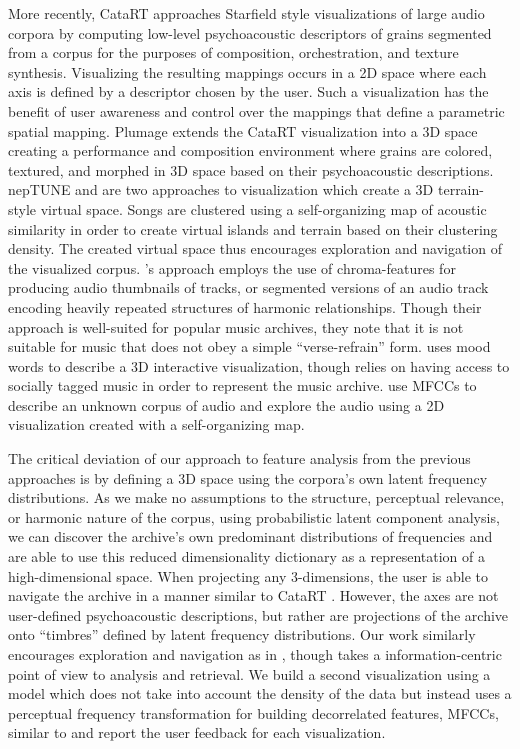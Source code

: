 More recently, CataRT \cite{Schwarz2008} approaches Starfield style visualizations of large audio corpora by computing low-level psychoacoustic descriptors of grains segmented from a corpus for the purposes of composition, orchestration, and texture synthesis.  Visualizing the resulting mappings occurs in a 2D space where each axis is defined by a descriptor chosen by the user.  Such a visualization has the benefit of user awareness and control over the mappings that define a parametric spatial mapping.  Plumage \cite{Schwarz2008} extends the CataRT visualization into a 3D space creating a performance and composition environment where grains are colored, textured, and morphed in 3D space based on their psychoacoustic descriptions.  nepTUNE \cite{Knees2006} and \cite{Dominik2009} are two approaches to visualization which create a 3D terrain-style virtual space.  Songs are clustered using a self-organizing map of acoustic similarity in order to create virtual islands and terrain based on their clustering density.  The created virtual space thus encourages exploration and navigation of the visualized corpus.  \cite{Bartsch2001}'s approach employs the use of chroma-features for producing audio thumbnails of tracks, or segmented versions of an audio track encoding heavily repeated structures of harmonic relationships.  Though their approach is well-suited for popular music archives, they note that it is not suitable for music that does not obey a simple ``verse-refrain'' form.  \cite{Stewart2008} uses mood words to describe a 3D interactive visualization, though relies on having access to socially tagged music in order to represent the music archive.  \cite{Heise2012} use MFCCs to describe an unknown corpus of audio and explore the audio using a 2D visualization created with a self-organizing map.

The critical deviation of our approach to feature analysis from the previous approaches is by defining a 3D space using the corpora's own latent frequency distributions.  As we make no assumptions to the structure, perceptual relevance, or harmonic nature of the corpus, using probabilistic latent component analysis, we can discover the archive's own predominant distributions of frequencies and are able to use this reduced dimensionality dictionary as a representation of a high-dimensional space.  When projecting any 3-dimensions, the user is able to navigate the archive in a manner similar to CataRT \cite{Schwarz2008}. However, the axes are not user-defined psychoacoustic descriptions, but rather are projections of the archive onto ``timbres'' defined by latent frequency distributions.  Our work similarly encourages exploration and navigation as in  \cite{Knees2006,Dominik2009,Heise2012}, though takes a information-centric point of view to analysis and retrieval.   We build a second visualization using a model which does not take into account the density of the data but instead uses a perceptual frequency transformation for building decorrelated features, MFCCs, similar to \cite{Heise2012} and report the user feedback for each visualization.


